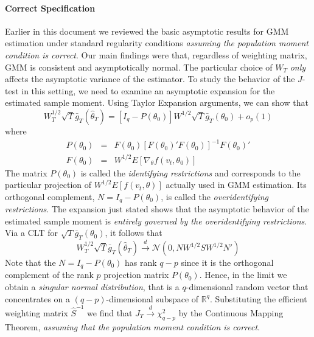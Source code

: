 \documentclass[12pt]{article}
\theoremstyle{definition}
\begin{document}
\paragraph{Correct Specification}
Earlier in this document we reviewed the basic asymptotic results for GMM estimation under standard regularity conditions \emph{assuming the population moment condition is correct}. Our main findings were that, regardless of weighting matrix, GMM is consistent and asymptotically normal. The particular choice of $W_T$ \emph{only} affects the asymptotic variance of the estimator. To study the behavior of the $J$-test in this setting, we need to examine an asymptotic expansion for the estimated sample moment. Using Taylor Expansion arguments, we can show that
	$$W_T^{1/2} \sqrt{T} \bar{g}_T(\widehat{\theta}_T) = \left[I_q - P(\theta_0) \right]W^{1/2} \sqrt{T} \bar{g}_T(\theta_0) + o_p(1)$$
where 
	\begin{eqnarray*}
	P(\theta_0) &=& F(\theta_0) \left[F(\theta_0)' F(\theta_0) \right]^{-1} F(\theta_0)'\\
		F(\theta_0) &=& W^{1/2} E[\nabla_\theta f(v_t, \theta_0)]
	\end{eqnarray*}
The matrix $P(\theta_0)$ is called the \emph{identifying restrictions} and corresponds to the particular projection of $W^{1/2}E[f(v_t,\theta)]$ actually used in GMM estimation. Its orthogonal complement, $N = I_q - P(\theta_0)$, is called the \emph{overidentifying restrictions}. The expansion just stated shows that the asymptotic behavior of the estimated sample moment is \emph{entirely governed by the overidentifying restrictions}. Via a CLT for $\sqrt{T} \bar{g}_T(\theta_0)$, it follows that
	$$W_T^{1/2} \sqrt{T} \bar{g}_T(\widehat{\theta}_T) \overset{d}{\rightarrow} \mathcal{N}(0, NW^{1/2}S W^{1/2}N')$$
Note that the $N = I_q - P(\theta_0)$ has rank $q-p$ since it is the orthogonal complement of the rank $p$ projection matrix $P(\theta_0)$. Hence, in the limit we obtain a \emph{singular normal distribution}, that is a $q$-dimensional random vector that concentrates on a $(q-p)$-dimensional subspace of $\mathbb{R}^q$. Substituting the efficient weighting matrix $\widehat{S}^{-1}$ we find that $J_T \overset{d}{\rightarrow} \chi^2_{q-p}$ by the Continuous Mapping Theorem, \emph{assuming that the population moment condition is correct}.
\end{document}
